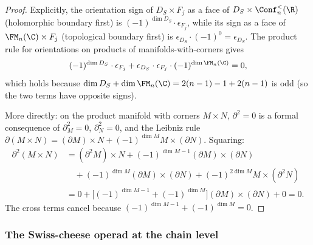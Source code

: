 \begin{proof}
Explicitly, the orientation sign of
$D_S \times F_j$ as a face of
$D_S \times \Conf_n^<(\R)$ (holomorphic boundary first)
is $(-1)^{\dim D_S} \cdot \epsilon_{F_j}$, while its
sign as a face of $\FM_n(\C) \times F_j$ (topological
boundary first) is
$\epsilon_{D_S} \cdot (-1)^0 = \epsilon_{D_S}$. The
product rule for orientations on products of
manifolds-with-corners gives
\[
(-1)^{\dim D_S} \cdot \epsilon_{F_j}
+ \epsilon_{D_S} \cdot \epsilon_{F_j}
\cdot (-1)^{\dim \FM_n(\C)}
= 0,
\]
which holds because
$\dim D_S + \dim \FM_n(\C) = 2(n-1) - 1 + 2(n-1)$
is odd (so the two terms have opposite signs).

More directly: on the product manifold with corners
$M \times N$, $\partial^2 = 0$ is a formal consequence
of $\partial^2_M = 0$, $\partial^2_N = 0$, and the
Leibniz rule
$\partial(M \times N) = (\partial M) \times N
+ (-1)^{\dim M} M \times (\partial N)$.
Squaring:
\begin{align*}
\partial^2(M \times N)
&= (\partial^2 M) \times N
+ (-1)^{\dim M - 1}(\partial M) \times (\partial N) \\
&\quad + (-1)^{\dim M}(\partial M) \times (\partial N)
+ (-1)^{2\dim M} M \times (\partial^2 N) \\
&= 0 + \bigl[(-1)^{\dim M - 1}
+ (-1)^{\dim M}\bigr]
(\partial M) \times (\partial N) + 0
= 0.
\end{align*}
The cross terms cancel because
$(-1)^{\dim M - 1} + (-1)^{\dim M} = 0$.
\end{proof}

\subsubsection{The Swiss-cheese operad at the chain level}

